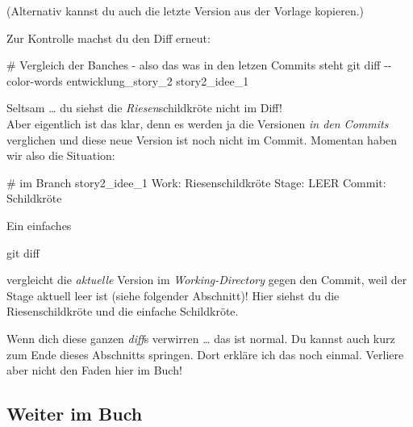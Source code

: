 \documentclass[
  ngerman,
  letterpaper,
  DIV=11]{scrreprt}
\newenvironment{Shaded}{\begin{snugshade}}{\end{snugshade}}
\newcommand{\AttributeTok}[1]{\textcolor[rgb]{0.40,0.45,0.13}{#1}}
\newcommand{\CommentTok}[1]{\textcolor[rgb]{0.37,0.37,0.37}{#1}}
\newcommand{\ExtensionTok}[1]{\textcolor[rgb]{0.00,0.23,0.31}{#1}}
\newcommand{\FunctionTok}[1]{\textcolor[rgb]{0.28,0.35,0.67}{#1}}
\newcommand{\NormalTok}[1]{\textcolor[rgb]{0.00,0.23,0.31}{#1}}
\newcommand{\work}{\textit{Working-Directory}\xspace}
\begin{document}
(Alternativ kannst du auch die letzte Version aus der Vorlage kopieren.)

Zur Kontrolle machst du den Diff erneut:

\begin{Shaded}
\begin{Highlighting}[]
\CommentTok{\# Vergleich der Banches {-} also das was in den letzen Commits steht}
\FunctionTok{git}\NormalTok{ diff }\AttributeTok{{-}{-}color{-}words}\NormalTok{ entwicklung\_story\_2 story2\_idee\_1}
\end{Highlighting}
\end{Shaded}

Seltsam \ldots{} du siehst die \emph{Riesen}schildkröte nicht im Diff!\\
Aber eigentlich ist das klar, denn es werden ja die Versionen \emph{in
den Commits} verglichen und diese neue Version ist noch nicht im Commit.
Momentan haben wir also die Situation:

\begin{Shaded}
\begin{Highlighting}[]
\CommentTok{\# im Branch story2\_idee\_1}
\ExtensionTok{Work:}\NormalTok{   Riesenschildkröte}
\ExtensionTok{Stage:}\NormalTok{  LEER}
\ExtensionTok{Commit:}\NormalTok{ Schildkröte}
\end{Highlighting}
\end{Shaded}

Ein einfaches

\begin{Shaded}
\begin{Highlighting}[]
\FunctionTok{git}\NormalTok{ diff }
\end{Highlighting}
\end{Shaded}

vergleicht die \emph{aktuelle} Version im \work gegen den Commit, weil
der Stage aktuell leer ist (siehe folgender Abschnitt)! Hier siehst du
die Riesenschildkröte und die einfache Schildkröte.

\samplestart

Wenn dich diese ganzen \emph{diff}s verwirren \ldots{} das ist normal.
Du kannst auch kurz zum Ende dieses Abschnitts springen. Dort erkläre
ich das noch einmal. Verliere aber nicht den Faden hier im Buch!
\sampleend

\subsection{Weiter im Buch}\label{weiter-im-buch}
\end{document}
